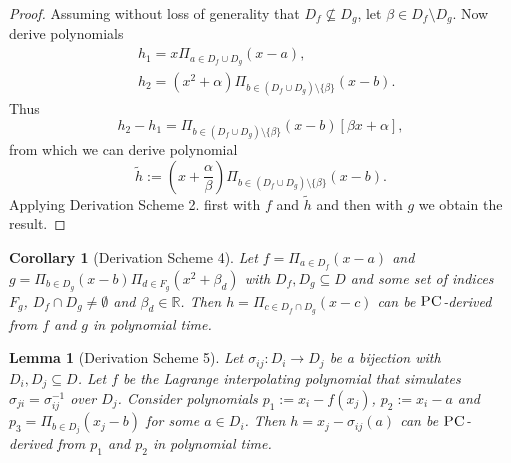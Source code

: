 \documentclass[11pt]{article}
\newcommand{\PC}{\textsc{PC}}
\newcommand{\1}{\textbf{1}}
\newtheorem{lemma}[theorem]{Lemma}
\newtheorem{corollary}[theorem]{Corollary}
\begin{document}
\begin{proof}
    Assuming without loss of generality that $D_f \nsubseteq D_g$, let $\beta \in D_f \setminus D_g$. Now derive polynomials
    \begin{align*}
        &h_1 = x \Pi_{a \in D_f \cup D_g} (x-a), \\
        &h_2 = (x^2 + \alpha) \Pi_{b \in (D_f \cup D_g) \setminus \{\beta\}} (x-b).
    \end{align*}
    Thus
    \begin{equation*}
        h_2 - h_1 = \Pi_{b \in (D_f \cup D_g) \setminus \{\beta \}} (x-b)[\beta x + \alpha],
    \end{equation*}
    from which we can derive polynomial
    \begin{equation*}
        \tilde{h} := \left( x + \frac{\alpha}{\beta} \right)\Pi_{b \in (D_f \cup D_g) \setminus \{\beta\}}(x-b).
    \end{equation*}
    Applying Derivation Scheme 2. first with $f$ and $\tilde{h}$ and then with $g$ we obtain the result.
\end{proof}

\begin{corollary}[Derivation Scheme 4]
    Let $f = \Pi_{a \in D_f} (x-a)$ and $g = \Pi_{b \in D_g}(x-b)\Pi_{d \in F_g}(x^2 + \beta_d)$ with $D_f, D_g \subseteq D$ and some set of indices $F_g$, $D_f \cap D_g \neq \emptyset$ and $\beta_d \in \mathbb{R}$. Then $h = \Pi_{c \in D_f \cap D_g}(x-c)$ can be $\PC$-derived from $f$ and $g$ in polynomial time.
\end{corollary}

\begin{lemma}[Derivation Scheme 5]
    Let $\sigma_{ij}:D_i \rightarrow D_j$ be a bijection with $D_i, D_j \subseteq D$. Let $f$ be the Lagrange interpolating polynomial that simulates $\sigma_{ji} = \sigma_{ij}^{-1}$ over $D_j$. Consider polynomials $p_1 := x_i - f(x_j)$, $p_2 := x_i - a$ and $p_3 = \Pi_{b \in D_j}(x_j - b)$ for some $a \in D_i$. Then $h = x_j - \sigma_{ij}(a)$ can be $\PC$-derived from $p_1$ and $p_2$ in polynomial time.
\end{lemma}
\end{document}
